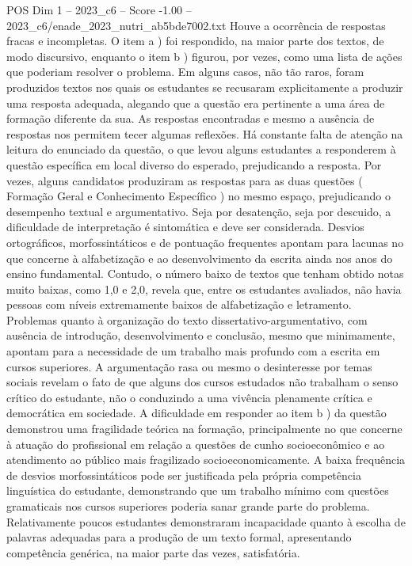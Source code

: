 \begin{textsample}{POS Dim 1 – 2023\_c6 – Score -1.00 – 2023\_c6/enade\_2023\_nutri\_ab5bde7002.txt}
Houve a ocorrência de respostas fracas e incompletas.
O item a ) foi respondido, na maior parte dos textos, de modo discursivo, enquanto o item b ) figurou, por vezes, como uma lista de ações que poderiam resolver o problema.
Em alguns casos, não tão raros, foram produzidos textos nos quais os estudantes se recusaram explicitamente a produzir uma resposta adequada, alegando que a questão era pertinente a uma área de formação diferente da sua.
As respostas encontradas e mesmo a ausência de respostas nos permitem tecer algumas reflexões.
Há constante falta de atenção na leitura do enunciado da questão, o que levou alguns estudantes a responderem à questão específica em local diverso do esperado, prejudicando a resposta.
Por vezes, alguns candidatos produziram as respostas para as duas questões ( Formação Geral e Conhecimento Específico ) no mesmo espaço, prejudicando o desempenho textual e argumentativo.
Seja por desatenção, seja por descuido, a dificuldade de interpretação é sintomática e deve ser considerada.
Desvios ortográficos, morfossintáticos e de pontuação frequentes apontam para lacunas no que concerne à alfabetização e ao desenvolvimento da escrita ainda nos anos do ensino fundamental.
Contudo, o número baixo de textos que tenham obtido notas muito baixas, como 1,0 e 2,0, revela que, entre os estudantes avaliados, não havia pessoas com níveis extremamente baixos de alfabetização e letramento.
Problemas quanto à organização do texto dissertativo-argumentativo, com ausência de introdução, desenvolvimento e conclusão, mesmo que minimamente, apontam para a necessidade de um trabalho mais profundo com a escrita em cursos superiores.
A argumentação rasa ou mesmo o desinteresse por temas sociais revelam o fato de que alguns dos cursos estudados não trabalham o senso crítico do estudante, não o conduzindo a uma vivência plenamente crítica e democrática em sociedade.
A dificuldade em responder ao item b ) da questão demonstrou uma fragilidade teórica na formação, principalmente no que concerne à atuação do profissional em relação a questões de cunho socioeconômico e ao atendimento ao público mais fragilizado socioeconomicamente.
A baixa frequência de desvios morfossintáticos pode ser justificada pela própria competência linguística do estudante, demonstrando que um trabalho mínimo com questões gramaticais nos cursos superiores poderia sanar grande parte do problema.
Relativamente poucos estudantes demonstraram incapacidade quanto à escolha de palavras adequadas para a produção de um texto formal, apresentando competência genérica, na maior parte das vezes, satisfatória.

\end{textsample}
